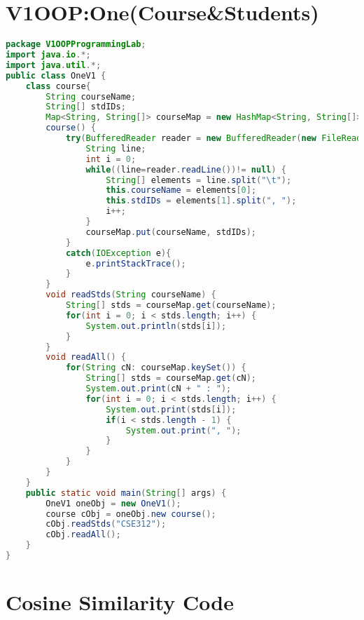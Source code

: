 \documentclass{article}
\begin{document}
\section*{V1OOP:One(Course&Students)}
\begin{lstlisting}[language=Java, caption=Cosine Similarity Implementation]
package V1OOPProgrammingLab;
import java.io.*;
import java.util.*;
public class OneV1 {
	class course{
		String courseName;
		String[] stdIDs;
		Map<String, String[]> courseMap = new HashMap<String, String[]>();
		course() {
			try(BufferedReader reader = new BufferedReader(new FileReader("D:\\Academic-Coding\\2nd-Semester\\OOP\\eclipse-workplace\\LabExamPractice\\src\\V1OOPProgrammingLab\\course.txt"))){
				String line;
				int i = 0;
				while((line=reader.readLine())!= null) {
					String[] elements = line.split("\t");
					this.courseName = elements[0];
					this.stdIDs = elements[1].split(", ");
					i++;
				}
				courseMap.put(courseName, stdIDs);
			}
			catch(IOException e){
				e.printStackTrace();
			}
		}
		void readStds(String courseName) {
			String[] stds = courseMap.get(courseName);
			for(int i = 0; i < stds.length; i++) {
				System.out.println(stds[i]);
			}
		}
		void readAll() {
			for(String cN: courseMap.keySet()) {
				String[] stds = courseMap.get(cN);
				System.out.print(cN + " : ");
				for(int i = 0; i < stds.length; i++) {
					System.out.print(stds[i]);
					if(i < stds.length - 1) {
						System.out.print(", ");
					}
				}
			}
		}
	}	
	public static void main(String[] args) {
		OneV1 oneObj = new OneV1();
		course cObj = oneObj.new course();
		cObj.readStds("CSE312");
		cObj.readAll();
	}
}

\end{lstlisting}

\section*{Cosine Similarity Code}
\begin{lstlisting}[language=Java, caption=Cosine Similarity Implementation]

\end{lstlisting}\\
\\
\end{document}
